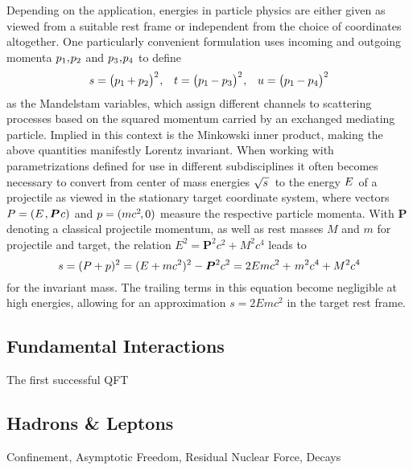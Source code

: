 Depending on the application, energies in particle physics are either given as viewed from a suitable rest frame or independent from
the choice of coordinates altogether. One particularly convenient formulation uses incoming and outgoing momenta
$p_1 , \kern-1.0pt p_2$ and $p_3 \kern+0.5pt , \kern-1.0pt p_4$ to define
\begin{align*}
	s = \bigl( p_1 \kern-0.5pt + p_2 \bigr)^2 \kern+0.5pt , &&
	t = \bigl( p_1 \kern-0.5pt - p_3 \bigr)^2 \kern+0.5pt , &&
	u = \bigl( p_1 \kern-0.5pt - p_4 \bigr)^2
\end{align*}
as the Mandelstam variables, which assign different channels to scattering processes based on the squared momentum carried by an
exchanged mediating particle. Implied in this context is the Minkowski inner product, making the above quantities manifestly Lorentz
invariant.
{\newpage}
When working with parametrizations defined for use in different subdisciplines it often becomes necessary to convert from center
of mass energies $\sqrt{s \kern+1.0pt} \kern+1.0pt$ to the energy $\kern-0.5pt E \kern+1.0pt$ of a projectile as viewed in the
stationary target coordinate system, where vectors $P = (E \kern+1.0pt , \bm{P} \kern+0.75pt c)$ and $p = (m c^2 \kern-1.0pt , 0)$
measure the respective particle momenta. With $\bm{P}$ denoting a classical projectile momentum, as well as rest masses $M$ and $m$
for projectile and target, the relation $E^2 = \bm{P}^2 c^2 + M^2 c^4$ leads to
\begin{equation*}
	s = (P + p)^2 = (E + m c^2)^2 - \bm{P}^2 c^2 = 2E m c^2 + \kern+1.0pt m^2 c^4 + M^2 c^4
\end{equation*}
for the invariant mass. The trailing terms in this equation become negligible at high energies, allowing for an approximation
$s = 2E m c^2$ in the target rest frame.



\subsection{Fundamental Interactions}
\label{sub:interactions}

The first successful QFT



\subsection{Hadrons \& Leptons}
\label{sub:hadrons}

Confinement, Asymptotic Freedom, Residual Nuclear Force, Decays



